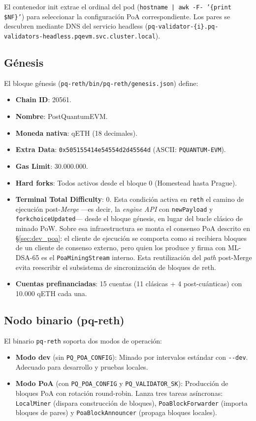El contenedor init extrae el ordinal del pod (\texttt{hostname | awk -F- '\{print \$NF\}'}) para seleccionar la configuración PoA correspondiente. Los pares se descubren mediante DNS del servicio headless (\texttt{pq-validator-\{i\}.pq-validators-headless.pqevm.svc.cluster.local}).

\subsection{Génesis}

El bloque génesis (\texttt{pq-reth/bin/pq-reth/genesis.json}) define:

\begin{itemize}
  \item \textbf{Chain ID}: 20561.
  \item \textbf{Nombre}: PostQuantumEVM.
  \item \textbf{Moneda nativa}: qETH (18 decimales).
  \item \textbf{Extra Data}: \texttt{0x505155414e54554d2d45564d} (ASCII: \texttt{PQUANTUM-EVM}).
  \item \textbf{Gas Limit}: 30.000.000.
  \item \textbf{Hard forks}: Todos activos desde el bloque 0 (Homestead hasta Prague).
  \item \textbf{Terminal Total Difficulty}: 0. Esta condición activa en \texttt{reth} el camino de ejecución post-\emph{Merge} ---es decir, la \emph{engine API} con \texttt{newPayload} y \texttt{forkchoiceUpdated}--- desde el bloque génesis, en lugar del bucle clásico de minado PoW. Sobre esa infraestructura se monta el consenso PoA descrito en \S\ref{sec:dev_poa}: el cliente de ejecución se comporta como si recibiera bloques de un cliente de consenso externo, pero quien los produce y firma con ML-DSA-65 es el \texttt{PoaMiningStream} interno. Esta reutilización del \emph{path} post-Merge evita reescribir el subsistema de sincronización de bloques de reth.
  \item \textbf{Cuentas prefinanciadas}: 15 cuentas (11 clásicas + 4 post-cuánticas) con 10.000 qETH cada una.
\end{itemize}

\subsection{Nodo binario (pq-reth)}

El binario \texttt{pq-reth} soporta dos modos de operación:

\begin{itemize}
  \item \textbf{Modo dev} (sin \texttt{PQ\_POA\_CONFIG}): Minado por intervalos estándar con \texttt{-{}-dev}. Adecuado para desarrollo y pruebas locales.
  \item \textbf{Modo PoA} (con \texttt{PQ\_POA\_CONFIG} y \texttt{PQ\_VALIDATOR\_SK}): Producción de bloques PoA con rotación round-robin. Lanza tres tareas asíncronas: \texttt{Local\-Miner} (dispara construcción de bloques), \texttt{Poa\-Block\-Forwarder} (importa bloques de pares) y \texttt{Poa\-Block\-Announcer} (propaga bloques locales).
\end{itemize}


